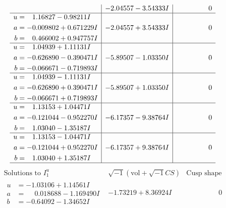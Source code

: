 \documentclass[1p]{elsarticle_modified}
\theoremstyle{definition}
\newcommand{\I}{\sqrt{-1}}
\begin{document}
$$\begin{array}{c|c|c}
 & -2.04557 - 3.54333 I & \phantom{-0.000000 } 0 \\ \hline\begin{aligned}
u &= \phantom{-}1.16827 - 0.98211 I \\
a &= -0.009802 + 0.671229 I \\
b &= \phantom{-}0.466002 + 0.947757 I\end{aligned}
 & -2.04557 + 3.54333 I & \phantom{-0.000000 } 0 \\ \hline\begin{aligned}
u &= \phantom{-}1.04939 + 1.11131 I \\
a &= -0.626890 - 0.390471 I \\
b &= -0.066671 - 0.719893 I\end{aligned}
 & -5.89507 - 1.03350 I & \phantom{-0.000000 } 0 \\ \hline\begin{aligned}
u &= \phantom{-}1.04939 - 1.11131 I \\
a &= -0.626890 + 0.390471 I \\
b &= -0.066671 + 0.719893 I\end{aligned}
 & -5.89507 + 1.03350 I & \phantom{-0.000000 } 0 \\ \hline\begin{aligned}
u &= \phantom{-}1.13153 + 1.04471 I \\
a &= -0.121044 - 0.952270 I \\
b &= \phantom{-}1.03040 - 1.35187 I\end{aligned}
 & -6.17357 - 9.38764 I & \phantom{-0.000000 } 0 \\ \hline\begin{aligned}
u &= \phantom{-}1.13153 - 1.04471 I \\
a &= -0.121044 + 0.952270 I \\
b &= \phantom{-}1.03040 + 1.35187 I\end{aligned}
 & -6.17357 + 9.38764 I & \phantom{-0.000000 } 0\\
 \hline 
 \end{array}$$\newpage$$\begin{array}{c|c|c}  
\text{Solutions to }I^u_{1}& \I (\text{vol} + \sqrt{-1}CS) & \text{Cusp shape}\\
 \hline 
\begin{aligned}
u &= -1.03106 + 1.14561 I \\
a &= \phantom{-}0.018688 - 1.169490 I \\
b &= -0.64092 - 1.34652 I\end{aligned}
 & -1.73219 + 8.36924 I & \phantom{-0.000000 } 0 \\ \hline\begin{aligned}

\end{aligned}
\end{array}$$
\end{document}
